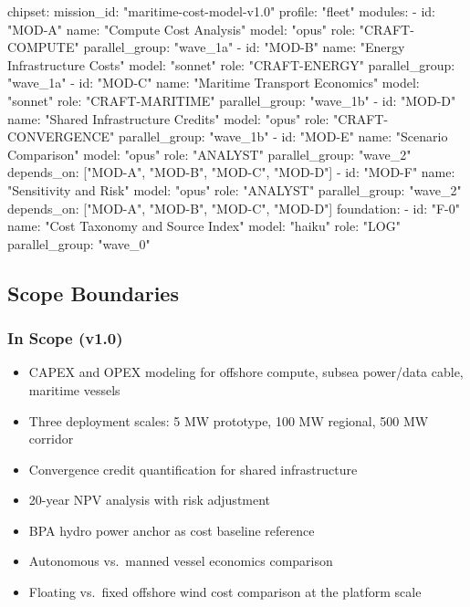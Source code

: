 \documentclass[11pt,letterpaper]{article}
\begin{document}
\begin{asciibox}
chipset:
  mission_id: "maritime-cost-model-v1.0"
  profile: "fleet"
  modules:
    - id: "MOD-A"
      name: "Compute Cost Analysis"
      model: "opus"
      role: "CRAFT-COMPUTE"
      parallel_group: "wave_1a"
    - id: "MOD-B"
      name: "Energy Infrastructure Costs"
      model: "sonnet"
      role: "CRAFT-ENERGY"
      parallel_group: "wave_1a"
    - id: "MOD-C"
      name: "Maritime Transport Economics"
      model: "sonnet"
      role: "CRAFT-MARITIME"
      parallel_group: "wave_1b"
    - id: "MOD-D"
      name: "Shared Infrastructure Credits"
      model: "opus"
      role: "CRAFT-CONVERGENCE"
      parallel_group: "wave_1b"
    - id: "MOD-E"
      name: "Scenario Comparison"
      model: "opus"
      role: "ANALYST"
      parallel_group: "wave_2"
      depends_on: ["MOD-A", "MOD-B", "MOD-C", "MOD-D"]
    - id: "MOD-F"
      name: "Sensitivity and Risk"
      model: "opus"
      role: "ANALYST"
      parallel_group: "wave_2"
      depends_on: ["MOD-A", "MOD-B", "MOD-C", "MOD-D"]
  foundation:
    - id: "F-0"
      name: "Cost Taxonomy and Source Index"
      model: "haiku"
      role: "LOG"
      parallel_group: "wave_0"
\end{asciibox}

\subsection{Scope Boundaries}

\subsubsection{In Scope (v1.0)}
\begin{itemize}[itemsep=2pt]
  \item CAPEX and OPEX modeling for offshore compute, subsea power/data cable, maritime vessels
  \item Three deployment scales: 5 MW prototype, 100 MW regional, 500 MW corridor
  \item Convergence credit quantification for shared infrastructure
  \item 20-year NPV analysis with risk adjustment
  \item BPA hydro power anchor as cost baseline reference
  \item Autonomous vs.\ manned vessel economics comparison
  \item Floating vs.\ fixed offshore wind cost comparison at the platform scale
\end{itemize}
\end{document}
